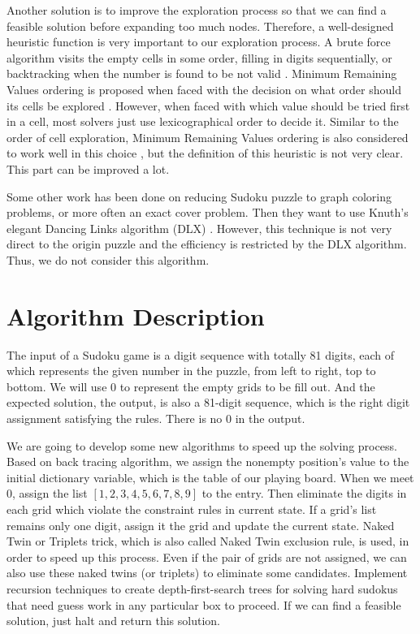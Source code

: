 \documentclass[12pt]{article}
\begin{document}
\begin{spacing}{1.1}
Another solution is to improve the exploration process so that we can find a feasible solution before expanding too much nodes. Therefore, a well-designed heuristic function is very important to our exploration process. A brute force algorithm visits the empty cells in some order, filling in digits sequentially, or backtracking when the number is found to be not valid \cite{bt}. Minimum Remaining Values ordering is proposed when faced with the decision on what order should its cells be explored \cite{rl}. However, when faced with which value should be tried first in a cell, most solvers just use lexicographical order to decide it. Similar to the order of cell exploration, Minimum Remaining Values ordering is also considered to work well in this choice \cite{rl}, but the definition of this heuristic is not very clear. This part can be improved a lot.

Some other work has been done on reducing Sudoku puzzle to graph coloring problems, or more often an exact cover problem. Then they want to use Knuth’s elegant Dancing Links algorithm (DLX) \cite{dlx}. However, this technique is not very direct to the origin puzzle and the efficiency is restricted by the DLX algorithm. Thus, we do not consider this algorithm.


\section{Algorithm Description}

The input of a Sudoku game is a digit sequence with totally 81 digits, each of which represents the given number in the puzzle, from left to right, top to bottom. We will use $ 0 $ to represent the empty grids to be fill out. And the expected solution, the output, is also a 81-digit sequence, which is the right digit assignment satisfying the rules. There is no $ 0 $ in the output.

We are going to develop some new algorithms to speed up the solving process. Based on back tracing algorithm, we assign the nonempty position's value to the initial dictionary variable, which is the table of our playing board. When we meet $ 0 $, assign the list $ [1,2,3,4,5,6,7,8,9] $ to the entry. Then eliminate the digits in each grid which violate the constraint rules in current state. If a grid's list remains only one digit, assign it the grid and update the current state. Naked Twin or Triplets trick, which is also called Naked Twin exclusion rule, is used,  in order to speed up this process. Even if the pair of grids are not assigned, we can also use these naked twins (or triplets) to eliminate some candidates. Implement recursion techniques to create depth-first-search trees for solving hard sudokus that need guess work in any particular box to proceed. If we can find a feasible solution, just halt and return this solution.



\end{spacing}
\end{document}
